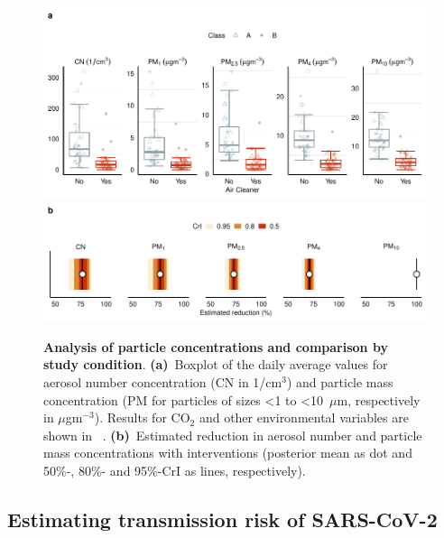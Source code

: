 \documentclass[fleqn,11pt]{wlscirep}
\begin{document}
\begin{figure}[!htpb]
\centering
    \includegraphics[width=\linewidth]{../../results/env-data/particles-boxplot.pdf}
    \includegraphics[width=\linewidth]{../../results/env-data/estimation-results-figure.pdf}
    \caption{\textbf{Analysis of particle concentrations and comparison by study condition}. \textbf{(a)}~Boxplot of the daily average values for aerosol number concentration (CN in 1/cm$^3$) and particle mass concentration (PM for particles of sizes <1 to <10~$\mu$m, respectively in $\mu$gm$^{-3}$). Results for CO$_2$ and other environmental variables are shown in \supp~. \textbf{(b)}~Estimated reduction in aerosol number and particle mass concentrations with interventions (posterior mean as dot and 50\%-, 80\%- and 95\%-CrI as lines, respectively). }
    \label{fig:palas-results}
\end{figure}

\subsection{Estimating transmission risk of SARS-CoV-2}
\end{document}
